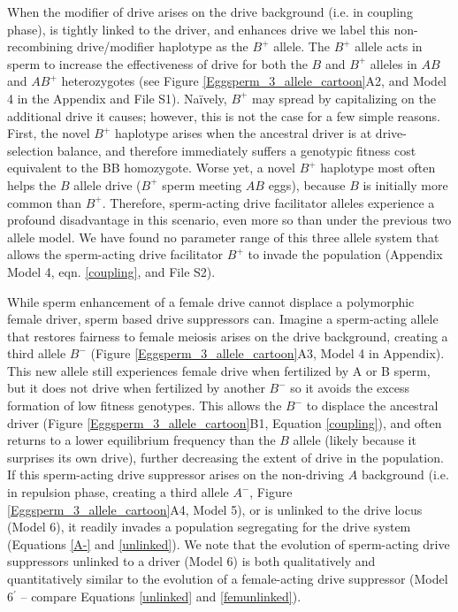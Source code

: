 \documentclass[12pt,letterpaper]{article}
\begin{document}
When the modifier of drive arises on the drive background (i.e. in coupling phase),
	is tightly linked to the driver, and enhances drive 
	we label  this non-recombining drive/modifier haplotype as the $B^+$ allele.  
The $B^+$ allele acts in sperm to increase the effectiveness of drive for both
	the $B$ and  $B^{+}$ alleles in $AB$ and $AB^{+}$
        heterozygotes (see Figure \ref{Eggsperm_3_allele_cartoon}A2, and
        Model 4 in the Appendix and File S1). 
Na\"{i}vely, $B^{+}$ may spread by capitalizing on the additional drive it causes; however,  
	this is not the case for a few simple reasons. 
First, 
	the novel $B^{+}$ haplotype
	arises when the ancestral driver 
	is at drive-selection balance, 
	and therefore immediately suffers a genotypic fitness cost equivalent to the BB homozygote.  
Worse yet, a novel $B^{+}$ haplotype most often helps 
	the $B$  allele drive ($B^+$ sperm meeting $AB$ eggs), because $B$ is initially more common than $B^{+}$. 
Therefore, sperm-acting drive facilitator alleles experience a profound disadvantage 
	in this scenario, even more so than under the previous two allele model. 
We have found no parameter range of this
	three allele system that allows the sperm-acting drive facilitator $B^{+}$ to
	invade the population (Appendix Model 4, eqn. \eqref{coupling}, and File S2). \newline 




While  sperm enhancement of a female drive cannot displace a polymorphic female driver, sperm based drive suppressors can. 
Imagine a sperm-acting allele that restores fairness to female meiosis arises on
	the drive background, creating a
        third allele $B^{-}$ (Figure
          \ref{Eggsperm_3_allele_cartoon}A3, Model 4 in Appendix). This new allele still
        experiences female drive when fertilized by A or B sperm, but 
       it does not drive when fertilized by another $B^{-}$ so it
       avoids the excess formation of low fitness genotypes. This
     allows the $B^{-}$ to displace the ancestral driver (Figure
     \ref{Eggsperm_3_allele_cartoon}B1, Equation \ref{coupling}), 
	and often returns to a lower equilibrium frequency than the $B$ allele (likely because it surprises its own drive), further decreasing the extent of drive in the population.  
If this sperm-acting drive suppressor arises on 
	the non-driving $A$ background (i.e. in repulsion phase, 
	creating a third allele $A^{-}$, Figure \ref{Eggsperm_3_allele_cartoon}A4, Model 5), 
	or is unlinked to the drive locus (Model 6), it readily invades a population segregating
	for the drive system (Equations \ref{A-} and
        \ref{unlinked}).  %
 We note that the evolution of sperm-acting drive  suppressors unlinked to a driver (Model 6)
 	is both qualitatively and quantitatively similar to the evolution  of a female-acting drive 
	suppressor (Model 6$^\prime$ -- compare Equations \ref{unlinked} and \ref{femunlinked}). 
        \newline
        
\end{document}
